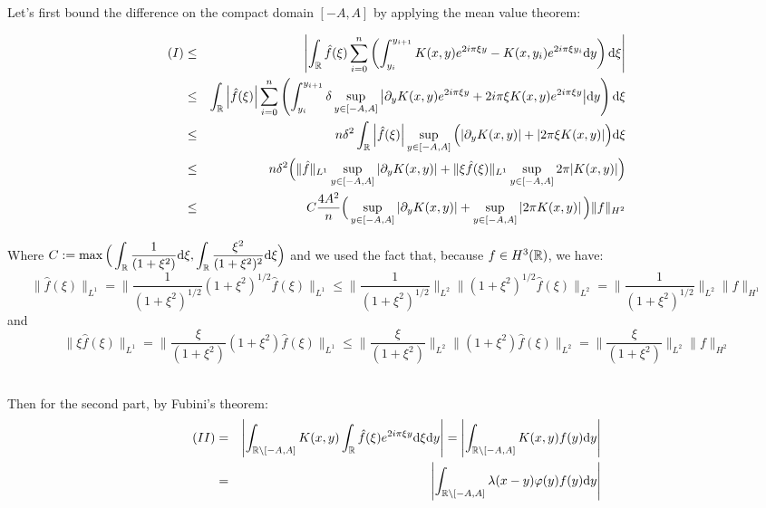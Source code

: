 \documentclass[11pt,a4paper]{article}
\begin{document}
Let's first bound the difference on the compact domain $[-A,A]$ by applying the mean value theorem:

\begin{eqnarray*}
(I) &\leq&  \left|  \int_\mathbb R \hat{f}(\xi)  \sum_{i=0}^n \left(\int_{y_i}^{y_{i+1}} K(x,y)e^{2i\pi\xi y} - K(x,y_i) e^{2i\pi\xi y_i}\mathrm{d}y \right)\mathrm{d}\xi \right| \\
&\leq&   \int_\mathbb R \left| \hat{f}(\xi) \right|  \sum_{i=0}^n \left(\int_{y_i}^{y_{i+1}}  \delta \sup_{y\in[-A,A]} {\left|\partial_yK(x,y)e^{2i\pi\xi y} +2i\pi\xi K(x,y)e^{2i\pi\xi y} \right|} \mathrm{d}y \right)\mathrm{d}\xi \\
&\leq&  n  \delta^2  \int_\mathbb R \left| \hat{f}(\xi) \right|  \sup_{y\in[-A,A]}\Big( {\left|\partial_yK(x,y)\right|+ \left|2\pi\xi K(x,y)\right|}\Big) \mathrm{d}\xi \\
&\leq&  n  \delta^2 \Big(\| \hat{f}\|_{L^1}  \sup_{y\in[-A,A]}{\left|\partial_yK(x,y)\right|} +  \| \xi\hat{f}(\xi)\|_{L^1} \sup_{y\in[-A,A]}{2\pi|K(x,y)|} \Big) \\
&\leq&  C\frac{4A^2}{n}  \Big(\sup_{y\in[-A,A]}\left|\partial_yK(x,y)\right| + \sup_{y\in[-A,A]}\left|2\pi K(x,y)\right| \Big) \| f\|_{H^2} \\
\end{eqnarray*}

Where $C := \max\Big(\displaystyle \int_\mathbb R \frac{1}{(1+\xi^2)} \mathrm{d}\xi,\int_\mathbb R \frac{\xi^2}{(1+\xi^2)^2} \mathrm{d}\xi\Big)$ and we used the fact that, because $f\in H^3(\mathbb R)$, we have: \[\| \hat{f}(\xi)\|_{L^1} = \| \frac{1}{(1+\xi^2)^{1/2}}(1+\xi^2)^{1/2}\hat{f}(\xi)\|_{L^1} \leq \| \frac{1}{(1+\xi^2)^{1/2}}\|_{L^2} \|(1+\xi^2)^{1/2}\hat{f}(\xi)\|_{L^2} = \| \frac{1}{(1+\xi^2)^{1/2}}\|_{L^2} \| f\|_{H^1}  \] 
and  \[\| \xi\hat{f}(\xi)\|_{L^1} = \| \frac{\xi}{(1+\xi^2)}(1+\xi^2)\hat{f}(\xi)\|_{L^1} \leq \| \frac{\xi}{(1+\xi^2)}\|_{L^2} \|(1+\xi^2)\hat{f}(\xi)\|_{L^2} = \| \frac{\xi}{(1+\xi^2)}\|_{L^2} \| f\|_{H^2}  \] 

~\\
Then for the second part, by Fubini's theorem:
\begin{eqnarray*}
(II) &=&  \left|\int_{\mathbb R \setminus [-A,A]} K(x,y) \int_\mathbb R \hat{f}(\xi) e^{2i\pi\xi y}\mathrm{d}\xi \mathrm{d}y\right|  =\left| \int_{\mathbb R \setminus [-A,A]} K(x,y) f(y)\mathrm{d}y \right|  \\
&=& \left| \int_{\mathbb R \setminus [-A,A]} \lambda(x-y)\varphi(y) f(y)\mathrm{d}y \right| 
\end{eqnarray*}
\end{document}
